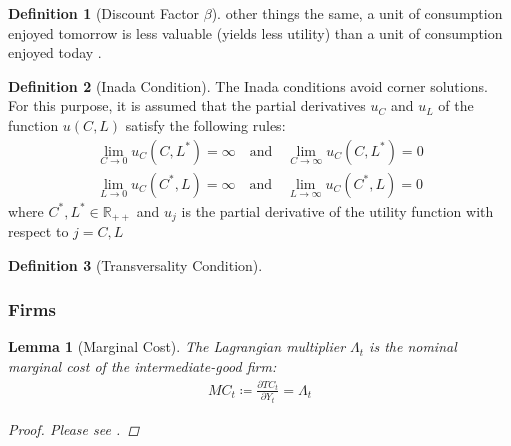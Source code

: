 \documentclass[
	12pt, 
	]{article}
\numberwithin{equation}{section}
\theoremstyle{definition}
\newtheorem{definition}{Definition}[section]
\theoremstyle{plain}
\theoremstyle{plain}
\newtheorem{lemma}{Lemma}[section]
\theoremstyle{plain}
\begin{document}
\begin{definition}[Discount Factor $\beta$]
	other things the same, a unit of consumption enjoyed tomorrow is less valuable (yields less utility) than a unit of consumption enjoyed today \cite[Lecture 2, p.1]{solis-garcia_ucb_2022}.
\end{definition}


\begin{definition}[Inada Condition] \label{def:Inada Condition}
	The Inada conditions \cite{inada_two-sector_1963} avoid corner solutions. For this purpose, it is assumed that the partial derivatives $u_C$ and $u_L$ of the function $u(C, L)$ satisfy the following rules:
	\begin{align}
		\lim_{C\to 0} u_C(C,L^\ast) = \infty \quad \text{and} \quad
		\lim_{C\to \infty} u_C(C,L^\ast) = 0 \\
		\lim_{L\to 0} u_C(C^\ast,L) = \infty \quad \text{and} \quad
		\lim_{L\to \infty} u_C(C^\ast,L) = 0 \nonumber
	\end{align}
	where $C^\ast,L^\ast \in \mathbb{R}_{++}$ and $u_j$ is the partial derivative of the utility function with respect to $j=C,L$ \cite[Lecture 1, p.2]{solis-garcia_ucb_2022}
\end{definition}


\begin{definition}[Transversality Condition]
	\cite[Lecture 4, p.4]{solis-garcia_ucb_2022}
\end{definition}


\subsubsection{Firms}


\begin{lemma}[Marginal Cost]\label{lemma:marginal-cost}
	The Lagrangian multiplier $\Lambda_t$ is the nominal marginal cost of the intermediate-good firm:
	\begin{align}
		MC_t \coloneq \frac{\partial TC_t}{\partial Y_t} = \Lambda_t
	\end{align}
	
	\begin{proof}
		Please see \textcite[p.449]{simon_mathematics_1994}.
	\end{proof}
	
\end{lemma}
\end{document}
